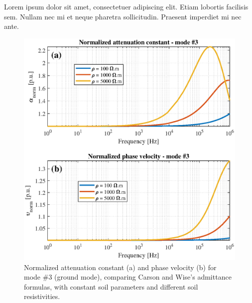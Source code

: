 \documentclass[lettersize,journal]{IEEEtran}
\newcommand*{\shortblindtext}{Lorem ipsum dolor sit amet, consectetuer adipiscing elit. Etiam lobortis facilisis sem. Nullam nec mi et neque pharetra sollicitudin. Praesent imperdiet mi nec ante.}
\begin{document}
\shortblindtext
\begin{figure}[ht]
	\centering
	\label{fig:WiseCarson___rho___CP_mode3}
	\includegraphics[width=1\columnwidth]{./fig/WiseCarson___rho___CP_mode3.eps}
	\caption{Normalized attenuation constant (a) and phase velocity (b) for mode \#3 (ground mode), comparing Carson and Wise's admittance formulas, with constant soil parameters and different soil resistivities.}
\end{figure}
\end{document}
